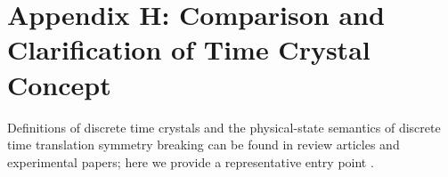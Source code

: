 \section{Appendix H: Comparison and Clarification of Time Crystal Concept}

Definitions of discrete time crystals and the physical-state semantics of discrete time translation symmetry breaking can be found in review articles and experimental papers; here we provide a representative entry point \cite{NaturePhysicsTimeCrystal}.
